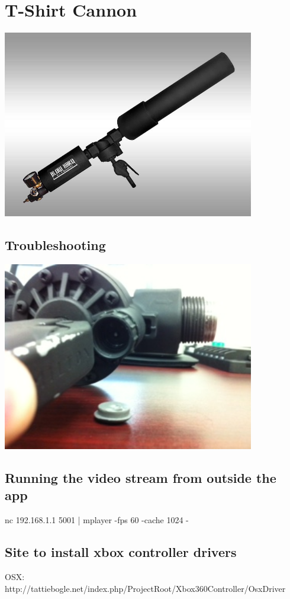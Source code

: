 \documentclass[letterpaper,12pt]{article}
\begin{document}
\section{T-Shirt Cannon}
\begin{center}
    \includegraphics[width=11cm]{pics/cannon/blowhard_cannon.jpg}
\end{center}

\subsection{Troubleshooting}
\begin{center}
    \includegraphics[width=11cm]{pics/cannon/broken_release_valve.jpg}
\end{center}


\subsection{Running the video stream from outside the app}
nc 192.168.1.1 5001 | mplayer -fps 60 -cache 1024 -

\subsection{Site to install xbox controller drivers}
OSX: http://tattiebogle.net/index.php/ProjectRoot/Xbox360Controller/OsxDriver
\end{document}
